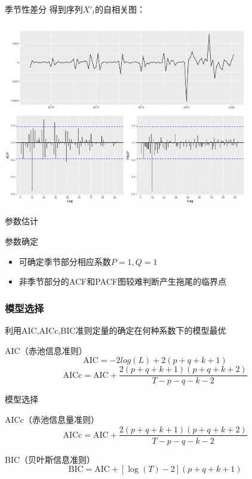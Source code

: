 \documentclass[10pt]{beamer}
\newcommand{\xiaowuhao}{\fontsize{9pt}{\baselineskip}\selectfont} %
\begin{document}
\begin{frame}{季节性差分}
  得到序列\(X'_t\)的自相关图：
  \begin{center}
    \includegraphics[width=0.8\textwidth]{figures/Season_diff.pdf}
  \end{center}   
\end{frame}

\begin{frame}{参数估计}
  \begin{block}{参数确定}
    \begin{itemize}
      \item 可确定季节部分相应系数\(P=1 , Q=1\)
      \item 非季节部分的ACF和PACF图较难判断产生拖尾的临界点
    \end{itemize}
  \end{block}
\end{frame}



\begin{frame}
  \frametitle{模型选择}
  利用AIC,AICc,BIC准则定量的确定在何种系数下的模型最优
  \begin{block}{AIC（赤池信息准则）}
    \[\text{AIC} = -2log(L) + 2(p+q+k+1)\]
    \xiaowuhao{其中\(L\)数据的似然函数，最后一项为参数个数(包含了余项的方差)\(k=0\)若\(c=0\),\(k=1\)若\(c\neq0\)
    对于ARIMA模型而言，修正过的AIC值可以被表示为：}
    \[\text{AICc} = \text{AIC} + \frac{2(p+q+k+1)(p+q+k+2)}{T-p-q-k-2}\]
  \end{block}
\end{frame}


\begin{frame}{模型选择}
    \begin{block}{AICc（赤池信息量准则）}
    \[\text{AICc} = \text{AIC} + \frac{2(p+q+k+1)(p+q+k+2)}{T-p-q-k-2}\]
  \end{block}
  \begin{block}{BIC（贝叶斯信息准则）}
    \[\text{BIC} = \text{AIC} + [\log(T)-2](p+q+k+1)\]
  \end{block}
\end{frame}
\end{document}
